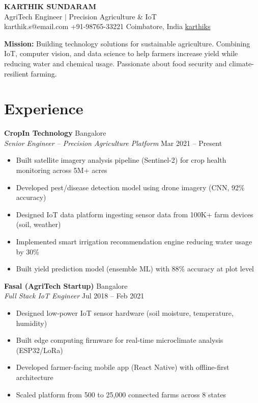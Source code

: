 \documentclass[11pt,letterpaper]{article}
\begin{document}
\begin{center}
{\LARGE\bfseries\color{brown} KARTHIK SUNDARAM}\\[4pt]
{\normalsize\color{olive} AgriTech Engineer $\vert$ Precision Agriculture \& IoT}\\[6pt]
{\small {} karthik.s@email.com \quad {} +91-98765-33221 \quad {} Coimbatore, India \quad {} \href{https://linkedin.com/in/karthiks}{karthiks}}
\end{center}

\vspace{6pt}
\noindent\colorbox{earth}{\parbox{\dimexpr\linewidth-2\fboxsep}{\small
{}\hspace{4pt}\textbf{Mission:} Building technology solutions for sustainable agriculture. Combining IoT, computer vision, and data science to help farmers increase yield while reducing water and chemical usage. Passionate about food security and climate-resilient farming.}}

\section{Experience}

\textbf{CropIn Technology} \hfill Bangalore\\
\textit{Senior Engineer -- Precision Agriculture Platform} \hfill Mar 2021 -- Present
\begin{itemize}
\item Built satellite imagery analysis pipeline (Sentinel-2) for crop health monitoring across 5M+ acres
\item Developed pest/disease detection model using drone imagery (CNN, 92\% accuracy)
\item Designed IoT data platform ingesting sensor data from 100K+ farm devices (soil, weather)
\item Implemented smart irrigation recommendation engine reducing water usage by 30\%
\item Built yield prediction model (ensemble ML) with 88\% accuracy at plot level
\end{itemize}

\textbf{Fasal (AgriTech Startup)} \hfill Bangalore\\
\textit{Full Stack IoT Engineer} \hfill Jul 2018 -- Feb 2021
\begin{itemize}
\item Designed low-power IoT sensor hardware (soil moisture, temperature, humidity)
\item Built edge computing firmware for real-time microclimate analysis (ESP32/LoRa)
\item Developed farmer-facing mobile app (React Native) with offline-first architecture
\item Scaled platform from 500 to 25,000 connected farms across 8 states
\end{itemize}
\end{document}
